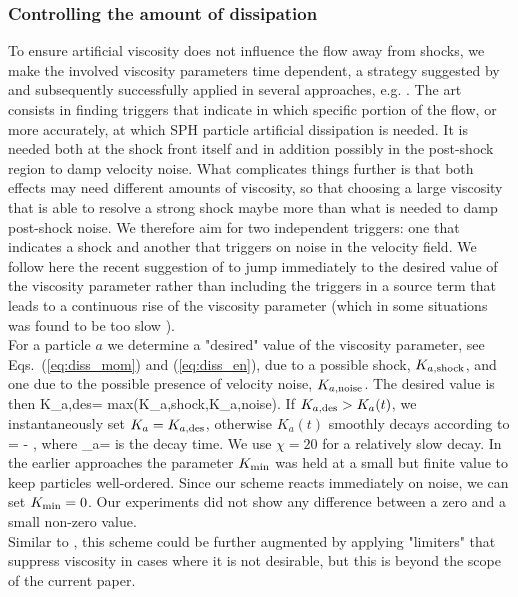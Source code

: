 \documentclass{elsart}
\begin{document}
\subsubsection{Controlling the amount of dissipation}
\label{sec:AV_controle}
To ensure artificial viscosity does not influence the flow away from shocks, we make the involved
viscosity parameters time dependent, a strategy suggested by \cite{morris97} and subsequently successfully applied in several approaches, e.g. \cite{rosswog00,dolag05,rosswog07c}.  The 
art consists in finding triggers that indicate in which specific portion of  the flow, or more accurately,
at which SPH particle artificial dissipation is needed. It is needed both at the shock front itself and in 
addition possibly in the post-shock region to damp velocity noise.
What complicates things further is that both effects may need different amounts of viscosity, so that choosing 
a large viscosity that is able to resolve a strong shock  maybe more than what is needed to damp post-shock noise.
We therefore aim for two independent triggers: one that indicates a shock and 
another that triggers on noise in the velocity field. We follow here the recent suggestion of \cite{cullen10} to 
jump immediately to the desired value of the viscosity parameter rather than including the triggers in a 
source term \cite{morris97,rosswog00} that leads to a continuous rise of the viscosity parameter (which in some 
situations was found to be too slow \cite{cullen10}).\\
For a particle $a$ we determine a "desired" value of the viscosity parameter, see Eqs.~(\ref{eq:diss_mom}) 
and (\ref{eq:diss_en}), due to a possible shock, $K_{a,\rm shock}$, and one due to the possible presence of 
velocity noise, $K_{a,\rm noise}$. The desired value is then
\be
     K_{a,\rm des}= {\rm max}(K_{a,\rm shock},K_{a,\rm noise}). 
\ee
If $K_{a,\rm des} > K_a(t)$, we instantaneously set $K_a= K_{a,\rm des}$, 
otherwise $K_a(t)$ smoothly decays according to
\be
{}= - ,
\label{eq:K_evol}
\ee
where 
\be
\tau_a= 
\ee
is the decay time. We use $\chi= 20$ for a relatively slow decay. In the earlier approaches 
\cite{morris97,rosswog00} the parameter $K_{\rm min}$ was held 
at a small but finite value to keep particles well-ordered. Since our scheme
reacts immediately on noise, we can set $K_{\rm min}=0$. Our experiments did
not show any difference between a zero and a small non-zero value.\\
Similar to \cite{balsara95,cullen10}, this scheme could be further augmented by applying "limiters"
that suppress viscosity in cases where it is not desirable,  but this is beyond the scope of the current paper.
\end{document}
